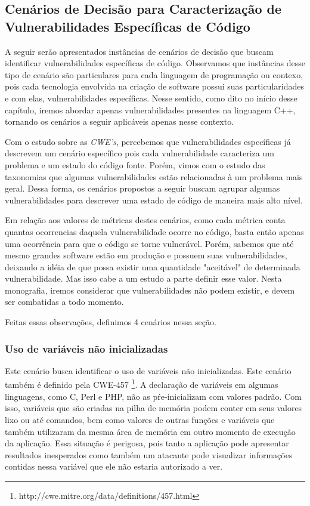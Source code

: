 \subsection{Cenários de Decisão para Caracterização de Vulnerabilidades Específicas de Código}
\label{cenarios-vulnerabilidades}

A seguir serão apresentados instâncias de cenários de decisão que buscam identificar vulnerabilidades específicas de código. Observamos que instâncias desse tipo de cenário são particulares para cada linguagem de programação ou contexo, pois cada tecnologia envolvida na criação de software possui suas particularidades e com elas, vulnerabilidades específicas. Nesse sentido, como dito no início desse capítulo, iremos abordar apenas vulnerabilidades presentes na linguagem C++, tornando os cenários a seguir aplicáveis apenas nesse contexto.

Com o estudo sobre as \emph{CWE's}, percebemos que vulnerabilidades específicas já descrevem um cenário específico pois cada vulnerabilidade caracteriza um problema e um estado do código fonte. Porém, vimos com o estudo das taxonomias que algumas vulnerabilidades estão relacionadas à um problema mais geral. Dessa forma, os cenários propostos a seguir buscam agrupar algumas vulnerabilidades para descrever uma estado de código de maneira mais alto nível.

Em relação aos valores de métricas destes cenários, como cada métrica conta quantas ocorrencias daquela vulnerabilidade ocorre no código, basta então apenas uma ocorrência para que o código se torne vulnerável. Porém, sabemos que até mesmo grandes software estão em produção e possuem suas vulnerabilidades, deixando a idéia de que possa existir uma quantidade "aceitável" de determinada vulnerabilidade. Mas isso cabe a um estudo a parte definir esse valor. Nesta monografia, iremos considerar que vulnerabilidades não podem existir, e devem ser combatidas a todo momento.

Feitas essas observações, definimos 4 cenários nessa seção.


\subsubsection{Uso de variáveis não inicializadas}

Este cenário busca identificar o uso de variáveis não inicializadas. Este cenário também é definido pela CWE-457 \footnote{http://cwe.mitre.org/data/definitions/457.html}.
%
A declaração de variáveis em algumas linguagens, como C, Perl e PHP, não as pŕe-inicializam com valores padrão. Com isso, variáveis que são criadas na pilha de memória podem conter em seus valores lixo ou até comandos, bem como valores de outras funções e variáveis que também utilizaram da mesma área de memória em outro momento de execução da aplicação.
%
Essa situação é perigosa, pois tanto a aplicação pode apresentar resultados inesperados como também um atacante pode visualizar informações contidas nessa variável que ele não estaria autorizado a ver. 

